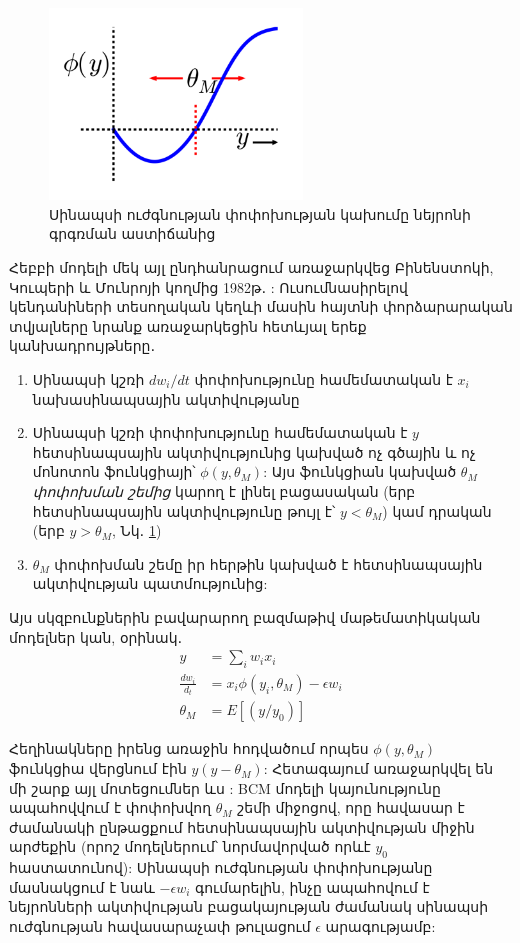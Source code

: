 \documentclass[12pt,final]{amsproc}
\begin{document}
\begin{figure}[b!]
\centering
\includegraphics[width=0.6\textwidth]{bcm.png}
\caption{Սինապսի ուժգնության փոփոխության կախումը նեյրոնի գրգռման աստիճանից \cite{BCMScholarpedia}}
\label{BCM}
\end{figure}

Հեբբի մոդելի մեկ այլ ընդհանրացում առաջարկվեց Բինենստոկի, Կուպերի և Մունրոյի կողմից 1982թ․ \cite{BCM1982}: Ուսումնասիրելով կենդանիների տեսողական կեղևի մասին հայտնի փորձարարական տվյալները նրանք առաջարկեցին հետևյալ երեք կանխադրույթները․
\begin{enumerate}
\item Սինապսի կշռի $dw_i/dt$ փոփոխությունը համեմատական է $x_i$ նախասինապսային ակտիվությանը
\item Սինապսի կշռի փոփոխությունը համեմատական է $y$ հետսինապսային ակտիվությունից կախված ոչ գծային և ոչ մոնոտոն ֆունկցիայի՝ $\phi(y, \theta_M)$: Այս ֆունկցիան կախված $\theta_M$ \textit{փոփոխման շեմից} կարող է լինել բացասական (երբ հետսինապսային ակտիվությունը թույլ է՝ $y < \theta_M$) կամ դրական (երբ $y > \theta_M$, Նկ․ \ref{BCM})
\item $\theta_M$ փոփոխման շեմը իր հերթին կախված է հետսինապսային ակտիվության պատմությունից:
\end{enumerate}

Այս սկզբունքներին բավարարող բազմաթիվ մաթեմատիկական մոդելներ կան, օրինակ․
\begin{align*}
y &= \sum\limits_{i}{w_ix_i} \\
\frac{dw_i}{d_t} &= x_i \phi(y_i, \theta_M) - \epsilon w_i \\
\theta_M &= E[(y/y_0)]
\end{align*}

Հեղինակները իրենց առաջին հոդվածում որպես $\phi(y, \theta_M)$ ֆունկցիա վերցնում էին $y(y-\theta_M)$: Հետագայում առաջարկվել են մի շարք այլ մոտեցումներ ևս \cite{BCMScholarpedia}: BCM մոդելի կայունությունը ապահովվում է փոփոխվող $\theta_M$ շեմի միջոցով, որը հավասար է ժամանակի ընթացքում հետսինապսային ակտիվության միջին արժեքին (որոշ մոդելներում՝ նորմավորված որևէ $y_0$ հաստատունով): Սինապսի ուժգնության փոփոխությանը մասնակցում է նաև $- \epsilon w_i$ գումարելին, ինչը ապահովում է նեյրոնների ակտիվության բացակայության ժամանակ սինապսի ուժգնության հավասարաչափ թուլացում $\epsilon$ արագությամբ:
\end{document}
